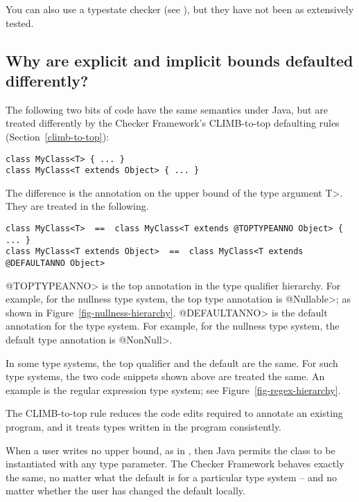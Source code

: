 You can also use a typestate checker (see
), but they have not been as extensively
tested.


\subsection{Why are explicit and implicit bounds defaulted differently?\label{faq-implicit-bounds}}

The following two bits of code have the same semantics under Java, but are
treated differently by the Checker Framework's CLIMB-to-top defaulting
rules (Section~\ref{climb-to-top}):

\begin{Verbatim}
class MyClass<T> { ... }
class MyClass<T extends Object> { ... }
\end{Verbatim}

The difference is the annotation on the upper bound of the type argument
\<T>.  They are treated in the following.

\begin{Verbatim}
class MyClass<T>  ==  class MyClass<T extends @TOPTYPEANNO Object> { ... }
class MyClass<T extends Object>  ==  class MyClass<T extends @DEFAULTANNO Object>
\end{Verbatim}

\noindent
\<@TOPTYPEANNO> is the top annotation in the type qualifier hierarchy.  For
example, for the nullness type system, the top type annotation is
\<@Nullable>; as shown in Figure~\ref{fig-nullness-hierarchy}.
\<@DEFAULTANNO> is the default annotation for the type system.  For
example, for the nullness type system, the default type annotation is
\<@NonNull>.

In some type systems, the top qualifier and the default are the same.  For
such type systems, the two code snippets shown above are treated the same.
An example is the regular expression type system; see
Figure~\ref{fig-regex-hierarchy}.

The CLIMB-to-top rule reduces the code edits required to annotate an
existing program, and it treats types written in the program consistently.

When a user writes no upper bound, as in
,
then Java permits the class to be instantiated with any type parameter.
The Checker Framework behaves exactly the same, no matter what the default
is for a particular type system -- and no matter whether the user has
changed the default locally.

